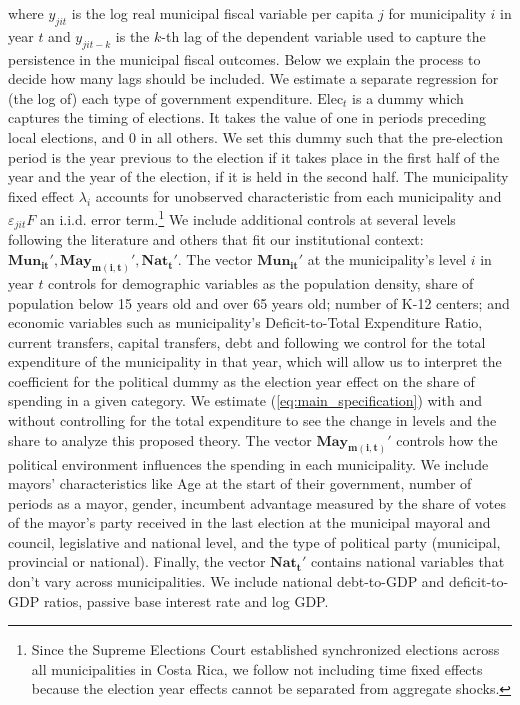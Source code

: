 where $y_{jit}$ is the log real municipal fiscal variable per capita $j$ for municipality $i$ in year $t$ and $y_{jit-k}$ is the $k$-th lag of the dependent variable used to capture the persistence in the municipal fiscal outcomes. Below we explain the process to decide how many lags should be included. We estimate a separate regression for (the log of) each type of government expenditure. $\text{Elec}_t$ is a dummy which captures the timing of elections. It takes the value of one in periods preceding local elections, and 0 in all others. We set this dummy such that the pre-election period is the year previous to the election if it takes place in the first half of the year and the year of the election, if it is held in the second half. The municipality fixed effect $\lambda_i$ accounts for unobserved characteristic from each municipality and $\varepsilon_{jit}F$ an i.i.d. error term.\footnote{Since the Supreme Elections Court established synchronized elections across all municipalities in Costa Rica, we follow \textcite{chortareas2016} not including time fixed effects because the election year effects cannot be separated from aggregate shocks. }  We include additional controls at several levels following the literature and others that fit our institutional context: $\mathbf{Mun_{it}'},\mathbf{May_{m(i,t)}'},\mathbf{Nat_{t}'}$. The vector $\mathbf{Mun_{it}'}$ at the municipality's level $i$ in year $t$ controls for demographic variables as the population density, share of population below 15 years old and over 65 years old; number of K-12 centers; and economic variables such as municipality's Deficit-to-Total Expenditure Ratio, current transfers, capital transfers, debt and following \textcite{drazen2010} we control for the total expenditure of the municipality in that year, which will allow us to interpret the coefficient for the political dummy as the election year effect on the share of spending in a given category. We estimate (\ref{eq:main_specification}) with and without controlling for the total expenditure to see the change in levels and the share to analyze this proposed theory. The vector $\mathbf{May_{m(i,t)}'}$ controls how the political environment influences the spending in each municipality. We include mayors' characteristics like Age at the start of their government, number of periods as a mayor, gender, incumbent advantage measured by the share of votes of the mayor's party received in the last election at the municipal mayoral and council, legislative and national level, and the type of political party (municipal, provincial or national). Finally, the vector $\mathbf{Nat_{t}'}$ contains national variables that don't vary across municipalities. We include national debt-to-GDP and deficit-to-GDP ratios, passive base interest rate and log GDP. 

